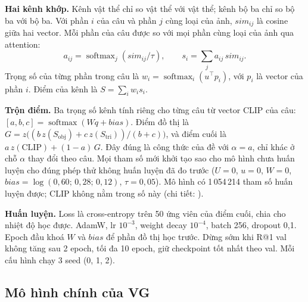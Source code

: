 \textbf{Hai kênh khớp.} Kênh vật thể chỉ so vật thể với vật thể; kênh bộ ba chỉ so bộ ba với bộ ba. Với phần $i$ của câu
và phần $j$ cùng loại của ảnh, $\mathit{sim}_{ij}$ là cosine giữa hai vector. Mỗi phần của câu được so với mọi phần cùng
loại của ảnh qua attention:
\begin{equation}
a_{ij} = \operatorname{softmax}_j\!\left(\mathit{sim}_{ij}/\tau\right),\qquad s_i = \textstyle\sum_j a_{ij}\,\mathit{sim}_{ij}.
\end{equation}
Trọng số của từng phần trong câu là
$w_i = \operatorname{softmax}_i(u^\top p_i)$, với $p_i$ là vector của phần $i$. Điểm của kênh là
$S = \sum_i w_i s_i$.

\textbf{Trộn điểm.} Ba trọng số kênh tính riêng cho từng câu từ vector CLIP của câu:
$[a, b, c] = \operatorname{softmax}(W q + \mathit{bias})$. Điểm đồ thị là
$G = z\big((b\,z(S_\text{obj}) + c\,z(S_\text{tri}))/(b+c)\big)$, và điểm cuối là $a\,z(\text{CLIP}) + (1-a)\,G$. Đây
đúng là công thức của đề với $\alpha = a$, chỉ khác ở chỗ $\alpha$ thay đổi theo câu. Mọi tham số mới khởi tạo sao cho mô
hình chưa huấn luyện cho đúng phép thử không huấn luyện đã đo trước ($U=0$, $u=0$, $W=0$,
$\mathit{bias} = \log(0{,}60;\,0{,}28;\,0{,}12)$, $\tau = 0{,}05$). Mô hình có 1\,054\,214 tham số huấn luyện được; CLIP
không nằm trong số này (chi tiết: ).

\textbf{Huấn luyện.} Loss là cross-entropy trên 50 ứng viên của điểm cuối, chia cho nhiệt độ học được. AdamW, lr
$10^{-3}$, weight decay $10^{-4}$, batch 256, dropout 0,1. Epoch đầu khoá $W$ và $\mathit{bias}$ để phần đồ thị học trước.
Dừng sớm khi R@1 val không tăng sau 2 epoch, tối đa 10 epoch, giữ checkpoint tốt nhất theo val. Mỗi cấu hình chạy 3 seed
(0, 1, 2).

\subsection{Mô hình chính của VG}
\label{sec:method-main}

